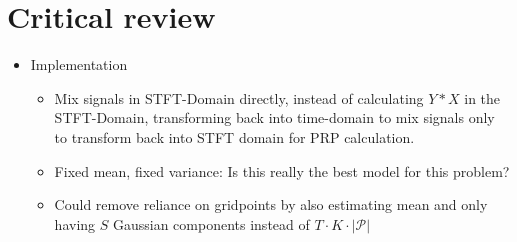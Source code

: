 \section{Critical review}

\begin{itemize}
    \item Implementation
    \begin{itemize}
        \item Mix signals in STFT-Domain directly, instead of calculating $Y*X$ in the STFT-Domain, transforming back into time-domain to mix signals only to transform back into STFT domain for PRP calculation.
        \item Fixed mean, fixed variance: Is this really the best model for this problem?
        \item Could remove reliance on gridpoints by also estimating mean and only having $S$ Gaussian components instead of $T\cdot K\cdot |\mathcal{P}|$
    \end{itemize}
\end{itemize}